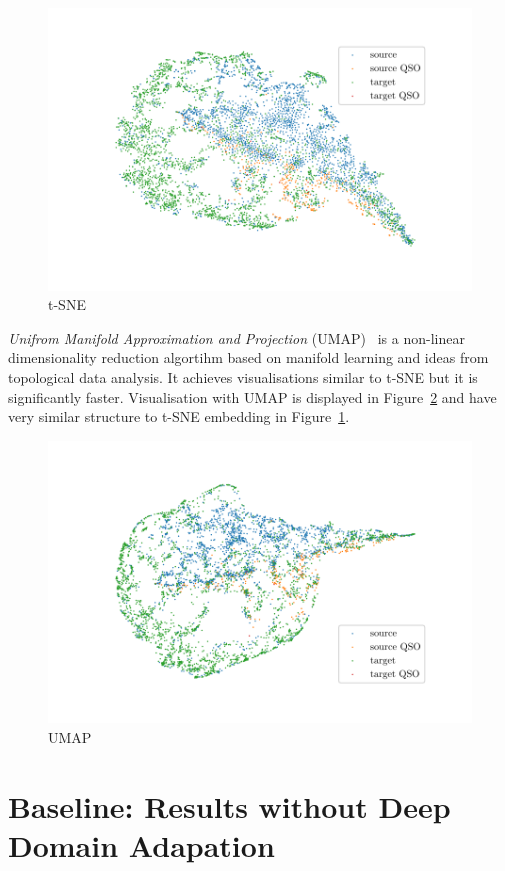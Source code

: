 \begin{figure}
	\includegraphics[width=\textwidth]{img/tsne.pdf}
	\caption{t-SNE}
	\label{tsne}
\end{figure}

\textit{Unifrom Manifold Approximation and Projection} (UMAP)~\cite{mcinnes2018}
is a non-linear dimensionality reduction algortihm based on manifold learning and ideas from topological data analysis.
It achieves visualisations similar to t-SNE but it is significantly faster.
Visualisation with UMAP is displayed in Figure~\ref{umap}
and have very similar structure to t-SNE embedding in Figure~\ref{tsne}.

\begin{figure}
	\includegraphics[width=\textwidth]{img/umap.pdf}
	\caption{UMAP}
	\label{umap}
\end{figure}

\section{Baseline: Results without Deep Domain Adapation}

